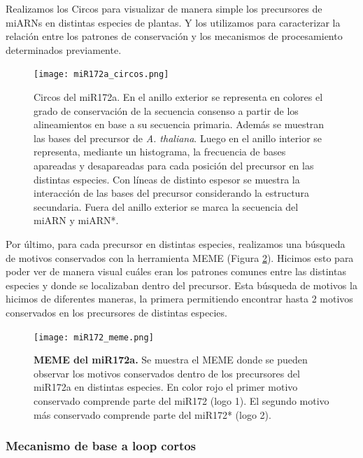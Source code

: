 Realizamos los Circos para visualizar de manera simple los precursores de miARNs en distintas especies de plantas.
Y los utilizamos para caracterizar la relación entre los patrones de conservación y los mecanismos de procesamiento determinados previamente.


\begin{figure}[htbp!] 
    \centering    
    \texttt{[image: miR172a\_circos.png]}
    \caption[Circos del miR172a]{Circos del miR172a.
En el anillo exterior se representa en colores el grado de conservación de la secuencia consenso a partir de los alineamientos en base a su secuencia primaria.
Además se muestran las bases del precursor de \textit {A. thaliana}.
Luego en el anillo interior se representa, mediante un histograma, la frecuencia de bases apareadas y desapareadas para cada posición del precursor en las distintas especies.
Con líneas de distinto espesor se muestra la interacción de las bases del precursor considerando la estructura secundaria. 
Fuera del anillo exterior se marca la secuencia del miARN y miARN*.
   }
     \label{fig:miR172a_circos}
\end{figure}

Por último, para cada precursor en distintas especies, realizamos una búsqueda de motivos conservados con la herramienta MEME \citep{pmid22115189} (Figura \ref{fig:miR172_meme}).
Hicimos esto para poder ver de manera visual cuáles eran los patrones comunes entre las distintas especies y donde se localizaban dentro del precursor.
Esta búsqueda de motivos la hicimos de diferentes maneras, la primera permitiendo encontrar hasta 2 motivos conservados en los precursores de distintas especies.


\begin{landscape}
    \begin{figure}[htbp!] 
        \centering    
        \texttt{[image: miR172\_meme.png]}
        \caption[MEME del miR172a]{
			\textbf{MEME del miR172a.}
        Se muestra el MEME donde se pueden observar los motivos conservados dentro de los precursores del miR172a en distintas especies.
        En color rojo el primer motivo conservado comprende parte del miR172 (logo 1).
        El segundo motivo más conservado comprende parte del miR172* (logo 2).
        }
        \label{fig:miR172_meme}
    \end{figure}
\end{landscape}

\subsubsection{Mecanismo de base a loop cortos}

